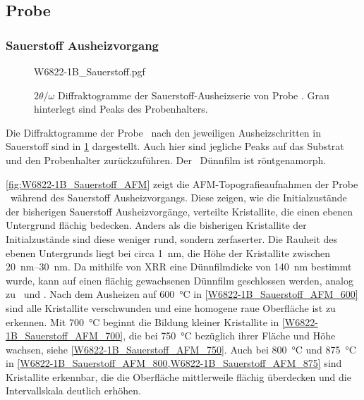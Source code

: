 
\newpage

\subsection{Probe \sampletwo}\label{subsec:probe-W6822-1}

\subsubsection{Sauerstoff Ausheizvorgang}\label{subsubsec:W6822-1B_Sauerstoff}
\begin{figure}
    \centering
    {W6822-1B_Sauerstoff.pgf}
    \caption{$2\theta/\omega$ Diffraktogramme der Sauerstoff-Ausheizserie von Probe \sampletwo.
    Grau hinterlegt sind Peaks des Probenhalters.}
    \label{fig:W6822-1B_Sauerstoff_XRD}
\end{figure}

Die Diffraktogramme der Probe \sampletwo\ nach den jeweiligen Ausheizschritten in Sauerstoff sind in
\cref{fig:W6822-1B_Sauerstoff_XRD} dargestellt.
Auch hier sind jegliche Peaks auf das Substrat und den Probenhalter zurückzuführen.
Der \heo\ Dünnfilm ist röntgenamorph.

\cref{fig:W6822-1B_Sauerstoff_AFM} zeigt die AFM-Topografieaufnahmen der Probe \sampletwo\ während des Sauerstoff
Ausheizvorgangs.
Diese zeigen, wie die Initialzustände der bisherigen Sauerstoff Ausheizvorgänge, verteilte Kristallite, die einen
ebenen Untergrund flächig bedecken.
Anders als die bisherigen Kristallite der Initialzustände sind diese weniger rund, sondern zerfaserter.
Die Rauheit des ebenen Untergrunds liegt bei circa \qty{1}{\nano\meter}, die Höhe der Kristallite zwischen
\qtyrange{20}{30}{\nano\meter}.
Da mithilfe von XRR eine Dünnfilmdicke von  \qty{140}{\nano\meter} bestimmt wurde, kann auf einen flächig
gewachsenen Dünnfilm geschlossen werden, analog zu \samplethree\ und \sampleone.
Nach dem Ausheizen auf \qty{600}{\degreeCelsius} in \cref{W6822-1B_Sauerstoff_AFM_600} sind alle Kristallite
verschwunden und eine homogene raue Oberfläche ist zu erkennen.
Mit \qty{700}{\degreeCelsius} beginnt die Bildung kleiner Kristallite in \cref{W6822-1B_Sauerstoff_AFM_700},
die bei \qty{750}{\degreeCelsius} bezüglich ihrer Fläche und Höhe wachsen, siehe \cref{W6822-1B_Sauerstoff_AFM_750}.
Auch bei \qty{800}{\degreeCelsius} und \qty{875}{\degreeCelsius} in
\cref{W6822-1B_Sauerstoff_AFM_800,W6822-1B_Sauerstoff_AFM_875} sind Kristallite erkennbar, die die Oberfläche
mittlerweile flächig überdecken und die Intervallskala deutlich erhöhen.

